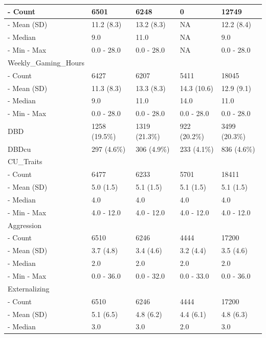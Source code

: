 \documentclass{article}
\begin{document}
\begin{table}
\begin{tabular}[t]{>{}l||>{}l||>{}l||>{}l||l}
\hline
-  Count & 6501 & 6248 & 0 & 12749\\
\hline
-  Mean (SD) & 11.2 (8.3) & 13.2 (8.3) & NA & 12.2 (8.4)\\
\hline
-  Median & 9.0 & 11.0 & NA & 9.0\\
\hline
-  Min -
                                                 Max & 0.0 - 28.0 & 0.0 - 28.0 & NA & 0.0 - 28.0\\
\hline
Weekly\_Gaming\_Hours &  &  &  & \\
\hline
-  Count & 6427 & 6207 & 5411 & 18045\\
\hline
-  Mean (SD) & 11.3 (8.3) & 13.3 (8.3) & 14.3 (10.6) & 12.9 (9.1)\\
\hline
-  Median & 9.0 & 11.0 & 14.0 & 11.0\\
\hline
-  Min -
                                                 Max & 0.0 - 28.0 & 0.0 - 28.0 & 0.0 - 28.0 & 0.0 - 28.0\\
\hline
DBD & 1258 (19.5\%) & 1319 (21.3\%) & 922 (20.2\%) & 3499 (20.3\%)\\
\hline
DBDcu & 297 (4.6\%) & 306 (4.9\%) & 233 (4.1\%) & 836 (4.6\%)\\
\hline
CU\_Traits &  &  &  & \\
\hline
-  Count & 6477 & 6233 & 5701 & 18411\\
\hline
-  Mean (SD) & 5.0 (1.5) & 5.1 (1.5) & 5.1 (1.5) & 5.1 (1.5)\\
\hline
-  Median & 4.0 & 4.0 & 4.0 & 4.0\\
\hline
-  Min -
                                                 Max & 4.0 - 12.0 & 4.0 - 12.0 & 4.0 - 12.0 & 4.0 - 12.0\\
\hline
Aggression &  &  &  & \\
\hline
-  Count & 6510 & 6246 & 4444 & \vphantom{5} 17200\\
\hline
-  Mean (SD) & 3.7 (4.8) & 3.4 (4.6) & 3.2 (4.4) & 3.5 (4.6)\\
\hline
-  Median & 2.0 & 2.0 & 2.0 & 2.0\\
\hline
-  Min -
                                                 Max & 0.0 - 36.0 & 0.0 - 32.0 & 0.0 - 33.0 & 0.0 - 36.0\\
\hline
Externalizing &  &  &  & \\
\hline
-  Count & 6510 & 6246 & 4444 & \vphantom{4} 17200\\
\hline
-  Mean (SD) & 5.1 (6.5) & 4.8 (6.2) & 4.4 (6.1) & 4.8 (6.3)\\
\hline
-  Median & 3.0 & 3.0 & 2.0 & 3.0\\

\end{tabular}
\end{table}
\end{document}
